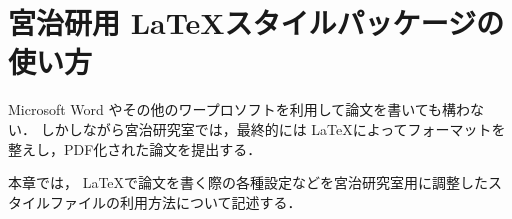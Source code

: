 \documentclass[a4paper,11pt,oneside,openany]{jsbook}
\begin{document}
\chapter{宮治研用 \LaTeX スタイルパッケージの使い方}
Microsoft Word やその他のワープロソフトを利用して論文を書いても構わない．
しかしながら宮治研究室では，最終的には \LaTeX によってフォーマットを整えし，PDF化された論文を提出する．

本章では， \LaTeX で論文を書く際の各種設定などを宮治研究室用に調整したスタイルファイルの利用方法について記述する．





%
\end{document}
